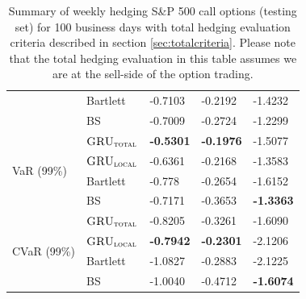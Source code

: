 \documentclass[letterpaper,12pt,titlepage,oneside,final]{book}
\numberwithin{equation}{section}
\theoremstyle{definition}
\newcommand{\modelT}{\textsc{GRU}_{\textsc{total}}}
\newcommand{\modelL}{\textsc{GRU}_{\textsc{local}}}
\begin{document}
\begin{table}[htp!]
\begin{tabular}{ll|l|l|l|}
		\multicolumn{1}{|l|}{}                                & Bartlett & -0.7103          & -0.2192          & -1.4232          \\  
		\multicolumn{1}{|l|}{}                                & BS       & -0.7009          & -0.2724          & -1.2299          \\ \hline
		\multicolumn{1}{|l|}{\multirow{4}{*}{VaR (99\%)}}     & $\modelT$    & \textbf{-0.5301} & \textbf{-0.1976} & -1.5077          \\  
		\multicolumn{1}{|l|}{}                                & $\modelL$    & -0.6361          & -0.2168          & -1.3583          \\  
		\multicolumn{1}{|l|}{}                                & Bartlett & -0.778           & -0.2654          & -1.6152          \\  
		\multicolumn{1}{|l|}{}                                & BS       & -0.7171          & -0.3653          & \textbf{-1.3363} \\ \hline
		\multicolumn{1}{|l|}{\multirow{4}{*}{CVaR (99\%)}}    & $\modelT$    & -0.8205          & -0.3261 & -1.6090          \\  
		\multicolumn{1}{|l|}{}                                & $\modelL$    & \textbf{-0.7942} & \textbf{-0.2301}          & -2.1206          \\  
		\multicolumn{1}{|l|}{}                                & Bartlett & -1.0827          & -0.2883          & -2.1225          \\  
		\multicolumn{1}{|l|}{}                                & BS       & -1.0040          & -0.4712          & \textbf{-1.6074} \\ \hline
	\end{tabular}
	\caption{Summary of weekly hedging S\&P 500 call options (testing set) for 100 business days with total hedging evaluation criteria described in  section \ref{sec:totalcriteria}. Please note that the total hedging evaluation in this table assumes we are at the sell-side of the option trading.} \label{table:CallTotalW}
\end{table}
\end{document}
